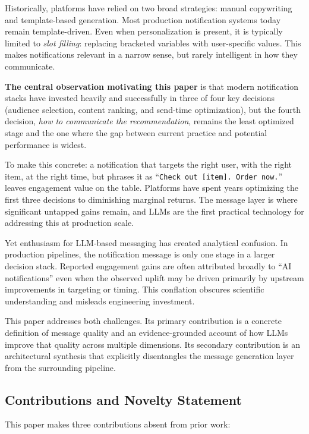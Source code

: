 \documentclass[11pt]{article}
\begin{document}
Historically, platforms have relied on two broad strategies: manual copywriting and template-based generation. Most production notification systems today remain template-driven. Even when personalization is present, it is typically limited to \textit{slot filling}: replacing bracketed variables with user-specific values. This makes notifications relevant in a narrow sense, but rarely intelligent in how they communicate.

\textbf{The central observation motivating this paper} is that modern notification stacks have invested heavily and successfully in three of four key decisions (audience selection, content ranking, and send-time optimization), but the fourth decision, \textit{how to communicate the recommendation}, remains the least optimized stage and the one where the gap between current practice and potential performance is widest.

To make this concrete: a notification that targets the right user, with the right item, at the right time, but phrases it as ``\texttt{Check out [item]. Order now.}'' leaves engagement value on the table. Platforms have spent years optimizing the first three decisions to diminishing marginal returns. The message layer is where significant untapped gains remain, and LLMs are the first practical technology for addressing this at production scale.

Yet enthusiasm for LLM-based messaging has created analytical confusion. In production pipelines, the notification message is only one stage in a larger decision stack. Reported engagement gains are often attributed broadly to ``AI notifications'' even when the observed uplift may be driven primarily by upstream improvements in targeting or timing. This conflation obscures scientific understanding and misleads engineering investment.

This paper addresses both challenges. Its primary contribution is a concrete definition of message quality and an evidence-grounded account of how LLMs improve that quality across multiple dimensions. Its secondary contribution is an architectural synthesis that explicitly disentangles the message generation layer from the surrounding pipeline.

\subsection{Contributions and Novelty Statement}

This paper makes three contributions absent from prior work:
\end{document}
